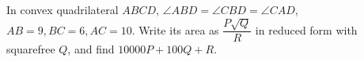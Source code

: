 In convex quadrilateral $ABCD$, $\angle ABD=\angle CBD=\angle CAD$, $AB=9,BC=6,AC=10$. Write its area as $\dfrac{P\sqrt Q}{R}$ in reduced form with squarefree $Q$, and find $10000P+100Q+R$.
